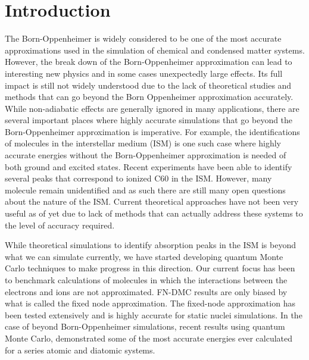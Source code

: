 \documentclass[aip,jcp,numerical,reprint]{revtex4-1}
\begin{document}
\section{Introduction}
The Born-Oppenheimer is widely considered to be one of the most accurate approximations used in the simulation of chemical and condensed matter systems.  However, the break down of the Born-Oppenheimer approximation can lead to interesting new physics and in some cases unexpectedly large effects. Its full impact is still not widely understood due to the lack of theoretical studies and methods that can go beyond the Born Oppenheimer approximation accurately.  While non-adiabatic effects are generally ignored in many applications, there are several important places where highly accurate simulations that go beyond the Born-Oppenheimer approximation is imperative.  For example, the identifications of molecules in the interstellar medium (ISM) is one such case where highly accurate energies without the Born-Oppenheimer approximation is needed of both ground and excited states.   Recent experiments have been able to identify several peaks that correspond to ionized C60 in the ISM.  However, many molecule remain unidentified and as such there are still many open questions about the nature of the ISM.  Current theoretical approaches have not been very useful as of yet due to lack of methods that can actually address these systems to the level of accuracy required.  

While  theoretical simulations to identify absorption peaks in the ISM is beyond what we can simulate currently, we have started developing quantum Monte Carlo techniques to make progress in this direction.   Our current focus has been to benchmark calculations of molecules in which the interactions between the electrons and ions are not approximated.   FN-DMC results are only biased by what is called the fixed node approximation.  %
The fixed-node approximation has been tested extensively and is highly accurate for static nuclei simulations.  In the case of beyond Born-Oppenheimer simulations, recent results using quantum Monte Carlo, demonstrated some of the most accurate energies ever calculated for a series atomic and diatomic systems.
\end{document}
